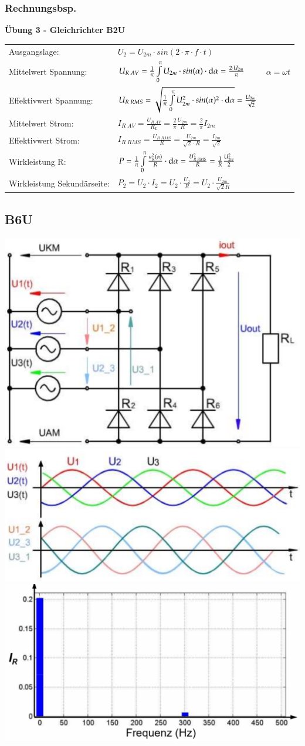 \subsubsection{Rechnungsbsp.}
\textbf{Übung 3 - Gleichrichter B2U}\newline
\renewcommand{\arraystretch}{2}
\begin{tabular}{ p{}  p{}  p{}}
    Ausgangslage:&
    $ U_2= U_{2m}\cdot sin(2\cdot \pi\cdot f\cdot t)$&
    \\
    Mittelwert Spannung: &
    $ U_{R \; AV}= \frac{1}{\pi} \int\limits_{0}^{\pi} U_{2m}\cdot sin(\alpha)\cdot\mathop{}\!\mathrm{d}\alpha=\frac{2\cdot U_{2m}}{\pi} $ &
    $ \alpha=\omega t $
    \\
    
    Effektivwert Spannung:   &
    $ U_{R \; RMS}= \sqrt{\frac{1}{\pi}\int\limits_{0}^{\pi} U_{2m}^2\cdot sin(\alpha)^2\cdot\mathop{}\!\mathrm{d}\alpha} = \frac{U_{2m}}{\sqrt{2}} $ &
    \\ 
    
    Mittelwert Strom: &
    $ I_{R \; AV}=\frac{U_{R \; AV}}{R_L}= \frac{2}{\pi}\frac{U_{2m}}{R}= \frac{2}{\pi} I_{2m} $ &
    \\
    
    Effektivwert Strom: &
    $ I_{R \; RMS}=\frac{U_{R \; RMS}}{R}= \frac{U_{2m}}{\sqrt{2}\cdot R}= \frac{I_{2m}}{\sqrt{2}} $ &
    \\
    
    Wirkleistung R: &
    $ P= \frac{1}{\pi}\int\limits_{0}^{\pi}\frac{u_R^2(\alpha)}{R}\cdot \mathop{}\!\mathrm{d} \alpha = \frac{U_{R \; RMS}^2}{R}=\frac{1}{R}\frac{U_{2m}^2}{2} $&
    \\
    Wirkleistung Sekundärseite: &
    $P_2=U_2\cdot I_2=U_2\cdot \frac{U_2}{R}=U_2\cdot \frac{U_{2m}}{\sqrt{2}R}$&
    \\
\end{tabular}


\subsection{B6U}
\includegraphics[width=0.3\linewidth]{images/PrakUGB6}
\includegraphics[width=0.3\linewidth]{images/PrakUGB6Kl1}
\includegraphics[width=0.3\linewidth]{images/UGB6OW}\newline
\clearpage